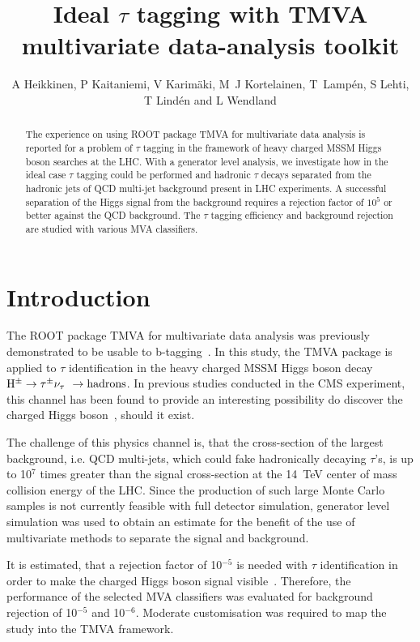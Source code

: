 \documentclass[a4paper]{jpconf}
\newcommand{\Hplustaunu}{\mbox{${\rm H}^{\pm} \to \tau^{\pm}\nu_{\tau}$}}
\begin{document}
\title{Ideal $\tau$ tagging with TMVA multivariate data-analysis toolkit}

\author{A Heikkinen, P Kaitaniemi, V Karim\"{a}ki,
M~J Kortelainen, T~Lamp\'{e}n, S Lehti, T Lind\'{e}n and L Wendland} 

\address{Helsinki Institute of Physics, P.O. Box 64, FIN-00014 University of Helsinki, Finland}



\begin{abstract}
The experience on using ROOT package TMVA for
multivariate data analysis is reported for a problem of $\tau$ tagging in the
framework of heavy charged MSSM Higgs boson searches at the LHC.
With a generator level analysis,
we investigate how in the ideal case $\tau$ tagging could be performed and
hadronic $\tau$ decays separated from the
hadronic jets of QCD multi-jet background present in LHC experiments.
A successful separation of the Higgs signal from the background
requires a rejection factor of $10^5$ or better against the QCD background.
The $\tau$ tagging efficiency and background rejection are studied with various MVA classifiers.
\end{abstract}


\section{Introduction}
The ROOT package TMVA for multivariate data analysis was previously demonstrated
to be usable to b-tagging~\cite{chep07tmva}. In this study, the TMVA
package is applied to $\tau$ identification in the heavy charged MSSM Higgs
boson decay \Hplustaunu~$\to {\rm hadrons}$. In previous studies
conducted in the CMS experiment, this channel has been found to
provide an interesting possibility do discover the charged Higgs
boson~\cite{ptdrII}, should it exist.

The challenge of this physics channel is, that the cross-section of
the largest background, i.e. QCD multi-jets, which could fake
hadronically decaying $\tau$'s, is up to 10$^7$ times
greater than the signal cross-section at the 14~TeV center of mass
collision energy of the LHC. 
Since the production of such large Monte Carlo samples is not
currently feasible with full detector simulation, generator level
simulation was used to obtain an estimate for the
benefit of the use of multivariate methods to separate the signal and
background.

It is estimated, that a rejection factor of 10$^{-5}$ is needed with
$\tau$ identification in order to make the charged Higgs boson signal
visible~\cite{ptdrII}. Therefore, the performance of the selected MVA
classifiers was evaluated for background rejection of 10$^{-5}$ and
10$^{-6}$. Moderate customisation was required to map the study into
the TMVA framework.
\end{document}
